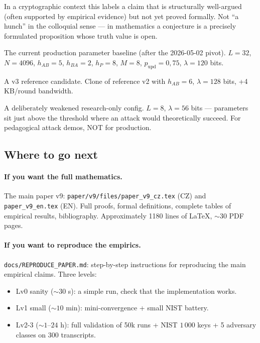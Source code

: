 \documentclass[11pt,a4paper]{article}
\begin{document}
\begin{description}[leftmargin=*, style=nextline]
\item[Conjectural] In a cryptographic context this labels a claim that is structurally well-argued (often supported by empirical evidence) but not yet proved formally. Not ``a hunch'' in the colloquial sense --- in mathematics a conjecture is a precisely formulated proposition whose truth value is open.
\item[Reference v2] The current production parameter baseline (after the 2026-05-02 pivot). $L=32$, $N=4096$, $h_{AB}=5$, $h_{BA}=2$, $h_P=8$, $M=8$, $p_\text{upd}=0{,}75$, $\lambda=120$ bits.
\item[\texttt{reference\_h\_AB6}] A v3 reference candidate. Clone of reference v2 with $h_{AB} = 6$, $\lambda = 128$ bits, +4 KB/round bandwidth.
\item[\texttt{break\_demo}] A deliberately weakened research-only config. $L=8$, $\lambda = 56$ bits --- parameters sit just above the threshold where an attack would theoretically succeed. For pedagogical attack demos, NOT for production.
\end{description}

\subsection{Where to go next}

\paragraph{If you want the full mathematics.} The main paper v9: \texttt{paper/v9/files/paper\_v9\_cz.tex} (CZ) and \texttt{paper\_v9\_en.tex} (EN). Full proofs, formal definitions, complete tables of empirical results, bibliography. Approximately 1180 lines of LaTeX, $\sim 30$ PDF pages.

\paragraph{If you want to reproduce the empirics.} \texttt{docs/REPRODUCE\_PAPER.md}: step-by-step instructions for reproducing the main empirical claims. Three levels:
\begin{itemize}[leftmargin=*]
\item Lv0 sanity ($\sim 30$ s): a simple run, check that the implementation works.
\item Lv1 small ($\sim 10$ min): mini-convergence + small NIST battery.
\item Lv2-3 ($\sim 1$--$24$ h): full validation of 50k runs + NIST $1\,000$ keys + 5 adversary classes on 300 transcripts.
\end{itemize}
\end{document}
